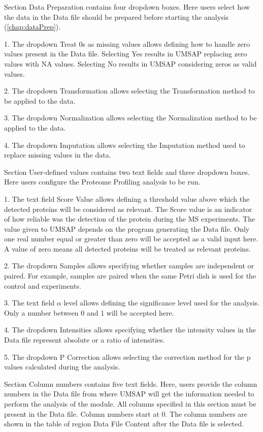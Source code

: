 Section Data Preparation contains four dropdown boxes. Here users select how the data
in the Data file should be prepared before starting the analysis (\autoref{chap:dataPrep}).

\num{1}. The dropdown Treat \num{0}s as missing values allows defining how
to handle zero values present in the Data file. Selecting Yes results in UMSAP
replacing zero values with NA values. Selecting No results in UMSAP considering
zeros as valid values.

\num{2}. The dropdown Transformation allows selecting the Transformation method
to be applied to the data.

\num{3}. The dropdown Normalization allows selecting the Normalization method
to be applied to the data.

\num{4}. The dropdown Imputation allows selecting the Imputation method used
to replace missing values in the data.

Section User-defined values contains two text fields and three dropdown boxes. Here
users configure the Proteome Profiling analysis to be run.

\num{1}. The text field Score Value\label{par:protprofScoreValue} allows
defining a threshold value above which the detected proteins will be considered as
relevant. The Score value is an indicator of how reliable was the detection of
the protein during the MS experiments. The value given to UMSAP depends on the program
generating the Data file. Only one real number equal or greater than zero will be
accepted as a valid input here. A value of zero means all detected proteins will be
treated as relevant proteins.

\num{2}. The dropdown Samples allows specifying whether samples are independent
or paired. For example, samples are paired when the same Petri dish is used for the
control and experiments.

\num{3}. The text field $\alpha$ level allows defining the significance level
used for the analysis. Only a number between \num{0} and \num{1} will be accepted
here.

\num{4}. The dropdown Intensities allows specifying whether the intensity values
in the Data file represent absolute or a ratio of intensities.

\num{5}. The dropdown P Correction allows selecting the correction method for
the p values calculated during the analysis.

Section Column numbers contains five text fields. Here, users provide the column
numbers in the Data file from where UMSAP will get the information needed to perform
the analysis of the module. All columns specified in this section must be present
in the Data file. Column numbers start at \num{0}. The column numbers are shown in
the table of region Data File Content after the Data file is selected.

